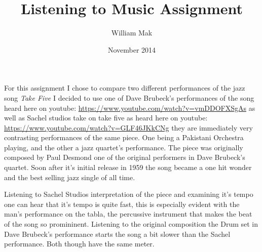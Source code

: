 \documentclass{article}
\title{Listening to Music Assignment}
\author{William Mak}
\date{November 2014}
\begin{document}
\maketitle

For this assignment I chose to compare two different performances of the jazz 
song {\it Take Five} I decided to use one of Dave Brubeck's performances of the 
song heard here on youtube:
\url{https://www.youtube.com/watch?v=vmDDOFXSgAs}
as well as Sachel studios take on take five as heard here on youtube:
\url{https://www.youtube.com/watch?v=GLF46JKkCNg}
they are immediately very contrasting performances of the same piece. One being
a Pakistani Orchestra playing, and the other a jazz quartet's performance. The
piece was originally composed by Paul Desmond one of the original performers in
Dave Brubeck's quartet. Soon after it's initial release in 1959 the song became
a one hit wonder and the best selling jazz single of all time.

Listening to Sachel Studios interpretation of the piece and examining it's tempo
one can hear that it's tempo is quite fast, this is especially evident with the
man's performance on the tabla, the percussive instrument that makes the beat of
the song so promininent. Listening to the original composition the Drum set in
Dave Brubeck's performance starts the song a bit slower than the Sachel
performance. Both though have the same meter.
\end{document}
